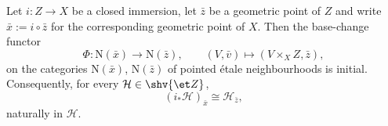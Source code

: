 \begin{lemma}[Stalks of $i_*$ on $Z$]
\label{lemma:openclosed-stalk-lowerStar}
\leanok
Let $i\colon Z\to X$ be a closed immersion, let $\bar z$ be a geometric point
of $Z$ and write $\bar x:=i\circ\bar z$ for the corresponding geometric point
of $X$.  Then the base-change functor
\[
  \Phi\colon\mathrm N(\bar x)\to\mathrm N(\bar z),
  \qquad(V,\bar v)\mapsto(V\times_XZ,\bar z),
\]
on the categories $\mathrm N(\bar x)$, $\mathrm N(\bar z)$ of pointed \'etale
neighbourhoods is initial.  Consequently, for every
$\mathcal H\in\shv{\et Z}$,
\[
  (i_*\mathcal H)_{\bar x}\cong\mathcal H_{\bar z},
\]
naturally in $\mathcal H$.
\end{lemma}
